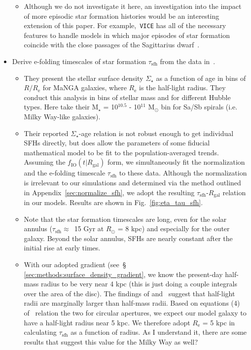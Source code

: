 \documentclass[fleqn, usenatbib]{mnras}
\begin{document}
\begin{itemize}
\begin{itemize}
		\item Although we do not investigate it here, an investigation into the 
		impact of more episodic star formation histories would be an 
		interesting extension of this paper. For example,~\texttt{VICE} has all 
		of the necessary features to handle models in which major episodes of 
		star formation coincide with the close passages of the Sagittarius 
		dwarf~\citep[e.g.][]{RuizLara2020}. 
	\end{itemize} 

	\item Derive e-folding timescales of star formation $\tau_\text{sfh}$ 
	from the data in~\citet{Sanchez2020}. 
	\begin{itemize} 
		\item They present the stellar surface density $\Sigma_\star$ as a 
		function of age in bins of $R/R_\text{e}$ for MaNGA galaxies, where 
		$R_\text{e}$ is the half-light radius. They conduct this analysis in 
		bins of stellar mass and for different Hubble types. Here take their 
		M$_\star$ = 10$^{10.5}$ - 10$^{11}$ M$_\odot$ bin for Sa/Sb spirals 
		(i.e. Milky Way-like galaxies). 

		\item Their reported $\Sigma_\star$-age relation is not robust enough 
		to get individual SFHs directly, but does allow the parameters of some 
		fiducial mathematical model to be fit to the population-averaged 
		trends. Assuming the $f_\text{IO}(t|R_\text{gal})$ form, we 
		simultaneously fit the normalization and the e-folding timescale 
		$\tau_\text{sfh}$ to these data. Although the normalization is 
		irrelevant to our simulations and determined via the method outlined 
		in Appendix~\ref{sec:normalize_sfh}, we adopt the resulting 
		$\tau_\text{sfh}$-$R_\text{gal}$ relation in our models. Results are 
		shown in Fig.~\ref{fig:eta_tau_sfh}. 

		\item Note that the star formation timescales are long, even for the 
		solar annulus ($\tau_\text{sfh} \approx$~15 Gyr at $R_\odot$ = 8 kpc) 
		and especially for the outer galaxy. Beyond the solar annulus, SFHs are 
		nearly constant after the initial rise at early times. 

		\item With our adopted gradient (see~\S 
		\ref{sec:methods:surface_density_gradient}, we know the present-day 
		half-mass radius to be very near 4 kpc (this is just doing a couple 
		integrals over the area of the disc). The findings of 
		\citet{Garcia-Benito2017} and~\citet{GonzalezDelgado2014} suggest that 
		half-light radii are marginally larger than half-mass radii. Based on 
		equations (4) of~\citet{GonzalezDelgado2014} relation the two for 
		circular apertures, we expect our model galaxy to have a half-light 
		radius near 5 kpc. We therefore adopt $R_\text{e}$ = 5 kpc in 
		calculating $\tau_\text{sfh}$ as a function of radius. {\color{red} 
		As I understand it, there are some results that suggest this value for 
		the Milky Way as well?} 
	\end{itemize} 


\end{itemize}
\end{document}
